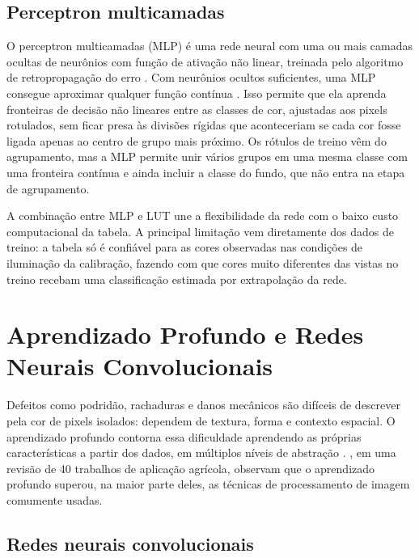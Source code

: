 \subsection{Perceptron multicamadas}

O perceptron multicamadas (MLP) é uma rede neural com uma ou mais camadas ocultas de neurônios com função de ativação não linear, treinada pelo algoritmo de retropropagação do erro \cite{rumelhart1986}. Com neurônios ocultos suficientes, uma MLP consegue aproximar qualquer função contínua \cite{hornik1989}. Isso permite que ela aprenda fronteiras de decisão não lineares entre as classes de cor, ajustadas aos pixels rotulados, sem ficar presa às divisões rígidas que aconteceriam se cada cor fosse ligada apenas ao centro de grupo mais próximo. Os rótulos de treino vêm do agrupamento, mas a MLP permite unir vários grupos em uma mesma classe com uma fronteira contínua e ainda incluir a classe do fundo, que não entra na etapa de agrupamento.

A combinação entre MLP e LUT une a flexibilidade da rede com o baixo custo computacional da tabela. A principal limitação vem diretamente dos dados de treino: a tabela só é confiável para as cores observadas nas condições de iluminação da calibração, fazendo com que cores muito diferentes das vistas no treino recebam uma classificação estimada por extrapolação da rede.

\section{Aprendizado Profundo e Redes Neurais Convolucionais}

Defeitos como podridão, rachaduras e danos mecânicos são difíceis de descrever pela cor de pixels isolados: dependem de textura, forma e contexto espacial. O aprendizado profundo contorna essa dificuldade aprendendo as próprias características a partir dos dados, em múltiplos níveis de abstração \cite{lecun2015,goodfellow2016}. \textcite{kamilaris2018}, em uma revisão de 40 trabalhos de aplicação agrícola, observam que o aprendizado profundo superou, na maior parte deles, as técnicas de processamento de imagem comumente usadas.

\subsection{Redes neurais convolucionais}

